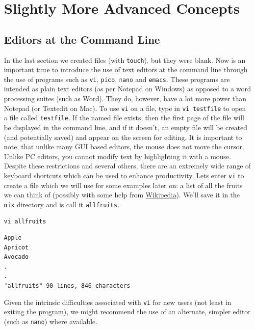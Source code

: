 \documentclass[11pt]{article}
\begin{document}
\section{Slightly More Advanced Concepts}

\subsection{Editors at the Command Line}

In the last section we created files (with \texttt{touch}), but they were blank. Now is an important time to introduce the use of text editors at the command line through the use of programs such as \texttt{vi}, \texttt{pico}, \texttt{nano} and \texttt{emacs}. These programs are intended as plain text editors (as per Notepad on Windows) as opposed to a word processing suites (such as Word). They do, however, have a lot more power than Notepad (or Textedit on Mac). To use \texttt{vi} on a file, type in \texttt{vi testfile} to open a file called \texttt{testfile}. If the named file exists, then the first page of the file will be displayed in the command line, and if it doesn't, an empty file will be created (and potentially saved) and appear on the screen for editing. It is important to note, that unlike many GUI based editors, the mouse does not move the cursor. Unlike PC editors, you cannot modify text by highlighting it with a mouse. Despite these restrictions and several others, there are an extremely wide range of keyboard shortcuts which can be used to enhance productivity. Lets enter \texttt{vi} to create a file which we will use for some examples later on: a list of all the fruits we can think of (possibly with some help from \href{https://simple.wikipedia.org/wiki/List_of_fruits}{Wikipedia}). We'll save it in the \texttt{nix} directory and is call it \texttt{allfruits}.

\begin{listing}[H]
\caption{\texttt{vi allfruits}}\vspace{-0.1in}
\begin{verbatim}
Apple
Apricot
Avocado
.
.
"allfruits" 90 lines, 846 characters
\end{verbatim}
\end{listing}
 
\noindent
Given the intrinsic difficulties associated with \texttt{vi} for new users (not least in \href{https://stackoverflow.blog/2017/05/23/stack-overflow-helping-one-million-developers-exit-vim/}{exiting the program}), we might recommend the use of an alternate, simpler editor (such as \texttt{nano}) where available.
\end{document}
